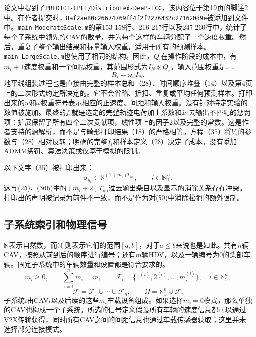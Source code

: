 \documentclass{article}
\begin{document}
论文中提到了\texttt{PREDICT-EPFL/Distributed-DeeP-LCC}，该内容位于第19页的脚注2中。在作者提交时，\texttt{8af2ae80c26674769ff4f2f2276332c271620d9e}被添加到文件中。\texttt{main\_ModerateScale.m}的第153-158行、216-217行以及247-260行中，统计了每个子系统中领先的CAV的数量，并为每个这样的车辆分配了一个速度权重。然后，重复了整个输出结果和标量输入权重，适用于所有的预测样本。\texttt{main\_LargeScale.m}也使用了相同的结构。因此，$Q_i$在操作阶段的成本中，有$m_i+1$速度权重和一个间隔权重，其范围形式为$I_N\otimes Q_i$。输入范围权重是……
\[
R_i=\omega_u I_N.
\]
地平线组装过程也是直接由完整的样本总和（28）、时间顺序堆叠（14）以及第4页上的二次形式约定所决定的。它不会省略、折扣、重复或平均任何预测样本。打印出来的$w$和$\omega$权重符号表示相应的正速度、间距和输入权重。没有针对特定实验的数值被施加。最终的$f_i$就是选定的完整轨迹电荷加上系数和过去输出不匹配的惩罚项：扩展保留了所有四个二次贡献项，线性项上的因子$2$以及完整的常数。这是作者支持的源解析，而不是与畸形打印结果（18）的严格相等。方程（35）将$V_i$的参数与（28）相对反转；明确的完整$f_i$和样本定义（28）决定了成本。没有添加ADMM惩罚、算法决策或仅基于模拟的限制。

以下文字（35）被打印出来：
\[
\sigma_{y_i}\in\mathbb R^{(1+m_i)T_{\mathrm{ini}}},
\qquad i\in\mathbb N_1^n.
\]
这与(25)、(36b)中的$(m_i+2)T_{\mathrm{ini}}$过去输出条目以及显示的消除关系存在冲突。打印出的声明被记录为前件不一致，而不是作为对(50)中消除松弛的额外限制。

\subsection*{子系统索引和物理信号}
$\mathbb N$表示自然数，而$\mathbb N_a^b$则表示它们的范围$[a,b]$，对于$a\leq b$来说也是如此。共有$n$辆CAV，按照从前到后的顺序进行编号；还有$m$辆HDV，以及一辆编号为$0$的头部车辆。固定子系统中的车辆数量和设置都是符合要求的。
\[
m_i\geq0,\qquad \sum_{i=1}^n m_i=m,
\qquad
\mathcal F_i=\{1^{(i)},2^{(i)},\ldots,m_i^{(i)}\},
\quad i\in\mathbb N_1^n,
\]
\[
\mathcal F=\mathcal F_1\cup\cdots\cup\mathcal F_n,
\qquad \Omega=\mathbb N_1^n\cup\mathcal F.
\]
子系统$i$由CAV$i$以及后续的这些$m_i$车载设备组成。如果选择$m_i=0$模式，那么单独的CAV也构成一个子系统。所选的信号定义假设所有车辆的速度信息都可以通过V2X传输获得，同时所有CAV之间的间距信息也通过车载传感器获取；这里并未选择部分连接模式。
\end{document}
